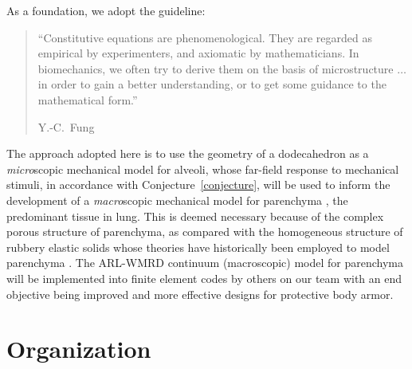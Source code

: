 As a foundation, we adopt the guideline:
\begin{quotation}
	\noindent\small ``Constitutive equations are phenomenological. They are regarded as empirical by experimenters, and axiomatic by mathematicians.  In biomechanics, we often try to derive them on the basis of micro\-structure $\ldots$ in order to gain a better understanding, or to get some guidance to the mathematical form.''
	
	\nopagebreak
	\mbox{} \hfill Y.-C.~Fung \cite[pg.~431]{Fung90} \normalsize
\end{quotation}
The approach adopted here is to use the geometry of a dodecahedron as a \textit{micro\/}scopic mechanical model for alveoli, whose far-field response to mechanical stimuli, in accordance with Conjecture~\ref{conjecture}, will be used to inform the development of a \textit{macro\/}scopic mechanical model for parenchyma \cite{ClaytonFreed19}, the predominant tissue in lung.  This is deemed necessary because of the complex porous structure of parenchyma, as compared with the homo\-geneous structure of rubbery elastic solids whose theories have historically been employed to model parenchyma \cite{Fung75,Fungetal78,Vawteretal79,Fung88}.  The ARL-WMRD continuum (macroscopic) model for parenchyma \cite{ClaytonFreed19} will be implemented into finite element codes by others on our team with an end objective being improved and more effective designs for protective body armor. 

\section{Organization}

